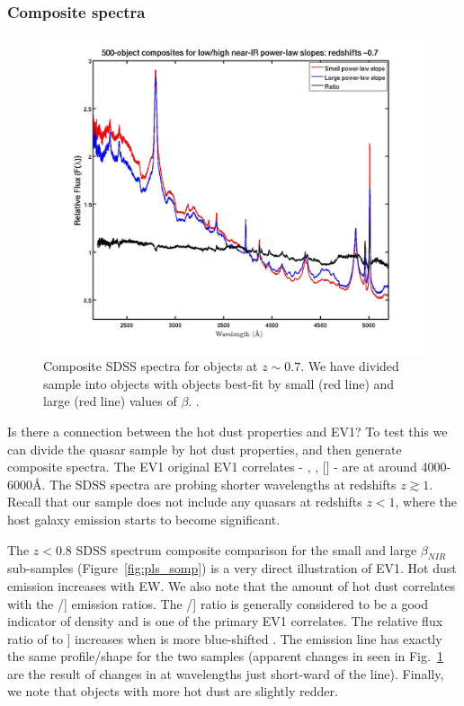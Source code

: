 \subsubsection{Composite spectra}

\begin{figure}
  \centering
  \includegraphics[width=\textwidth]{figures/chapter05/z07_pls_comps.jpg}
  \caption[{Composite SDSS spectra for objects at $z\sim0.7$.}]{Composite SDSS spectra for objects at $z\sim0.7$. We have divided sample into objects with objects best-fit by small (red line) and large (red line) values of $\beta$. .}
  \label{fig:pls_comp}
\end{figure}

Is there a connection between the hot dust properties and EV1? 
To test this we can divide the quasar sample by hot dust properties, and then generate composite spectra. 
The EV1 original EV1 correlates - , \hb, [] - are at around 4000-6000\AA. 
The SDSS spectra are probing shorter wavelengths at redshifts $z\gtrsim1$.
Recall that our sample does not include any quasars at redshifts $z<1$, where the host galaxy emission starts to become significant. 

The $z < 0.8$ SDSS spectrum composite comparison for the small and large $\beta_{NIR}$ sub-samples (Figure~\ref{fig:pls_somp}) is a very direct illustration of EV1. 
Hot dust emission increases with  EW. 
We also note that the amount of hot dust correlates with the /] emission ratios. 
The /] ratio is generally considered to be a good indicator of density and is one of the primary EV1 correlates. 
The relative flux ratio of  to ] increases when  is more blue-shifted \citep{richards11}. 
The  emission line has exactly the same profile/shape for the two samples (apparent changes in  seen in Fig.~\ref{fig:pls_comp} are the result of changes in  at wavelengths just short-ward of the line). 
Finally, we note that objects with more hot dust are slightly redder.

